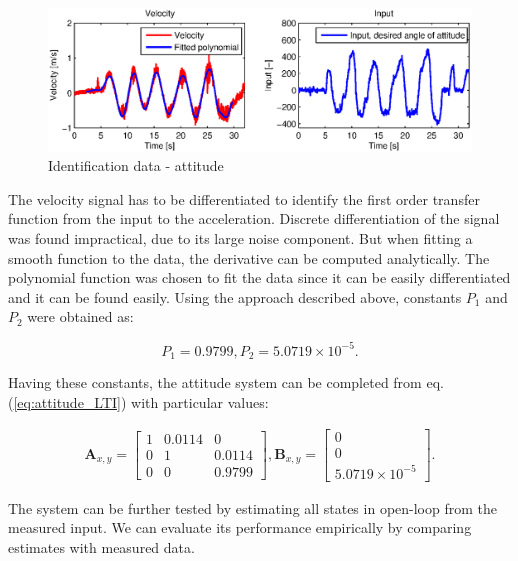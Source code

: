 \begin{figure}[h]
\includegraphics[width=1\textwidth]{fig/iden1.eps} 
\caption{Identification data - attitude}
\label{fig:iden1}
\end{figure}

The velocity signal has to be differentiated to identify the first order transfer function from the input to the acceleration. Discrete differentiation of the signal was found impractical, due to its large noise component. But when fitting a smooth function to the data, the derivative can be computed analytically. The polynomial function was chosen to fit the data since it can be easily differentiated and it can be found easily. Using the approach described above, constants $P_1$ and $P_2$ were obtained as:

\begin{equation}
P_1 = 0.9799, P_2 = 5.0719 \times 10^{-5}.
\label{eq:constants1}
\end{equation}

Having these constants, the attitude system can be completed from eq. (\ref{eq:attitude_LTI}) with particular values:

\begin{equation}
\begin{split}
\mathbf{A}_{x, y} = \begin{bmatrix}
1 & 0.0114 & 0 \\
0 & 1 & 0.0114 \\
0 & 0 & 0.9799
\end{bmatrix}, \mathbf{B}_{x, y} = \begin{bmatrix}
0\\
0\\
5.0719 \times 10^{-5}
\end{bmatrix}.
\end{split}
\label{eq:attitude_LTI_identified}
\end{equation}

The system can be further tested by estimating all states in open-loop from the measured input. We can evaluate its performance empirically by comparing estimates with measured data.

